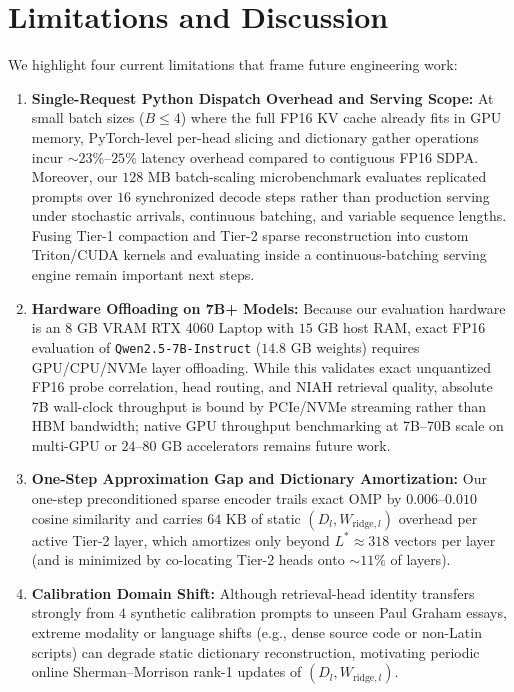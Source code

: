 \documentclass[conference]{IEEEtran}
\begin{document}
\section{Limitations and Discussion}
We highlight four current limitations that frame future engineering work:
\begin{enumerate}
    \item \textbf{Single-Request Python Dispatch Overhead and Serving Scope:} At small batch sizes ($B \le 4$) where the full FP16 KV cache already fits in GPU memory, PyTorch-level per-head slicing and dictionary gather operations incur $\sim 23\%$--$25\%$ latency overhead compared to contiguous FP16 SDPA. Moreover, our $128\text{ MB}$ batch-scaling microbenchmark evaluates replicated prompts over $16$ synchronized decode steps rather than production serving under stochastic arrivals, continuous batching, and variable sequence lengths. Fusing Tier-1 compaction and Tier-2 sparse reconstruction into custom Triton/CUDA kernels and evaluating inside a continuous-batching serving engine remain important next steps.
    \item \textbf{Hardware Offloading on 7B+ Models:} Because our evaluation hardware is an $8\text{ GB}$ VRAM RTX 4060 Laptop with $15\text{ GB}$ host RAM, exact FP16 evaluation of \texttt{Qwen2.5-7B-Instruct} ($14.8\text{ GB}$ weights) requires GPU/CPU/NVMe layer offloading. While this validates exact unquantized FP16 probe correlation, head routing, and NIAH retrieval quality, absolute 7B wall-clock throughput is bound by PCIe/NVMe streaming rather than HBM bandwidth; native GPU throughput benchmarking at 7B--70B scale on multi-GPU or $24$--$80\text{ GB}$ accelerators remains future work.
    \item \textbf{One-Step Approximation Gap and Dictionary Amortization:} Our one-step preconditioned sparse encoder trails exact OMP by $0.006$--$0.010$ cosine similarity and carries $64\text{ KB}$ of static $(D_l, W_{\text{ridge},l})$ overhead per active Tier-2 layer, which amortizes only beyond $L^* \approx 318$ vectors per layer (and is minimized by co-locating Tier-2 heads onto $\sim 11\%$ of layers).
    \item \textbf{Calibration Domain Shift:} Although retrieval-head identity transfers strongly from $4$ synthetic calibration prompts to unseen Paul Graham essays, extreme modality or language shifts (e.g., dense source code or non-Latin scripts) can degrade static dictionary reconstruction, motivating periodic online Sherman--Morrison rank-1 updates of $(D_l, W_{\text{ridge},l})$.
\end{enumerate}
\end{document}
